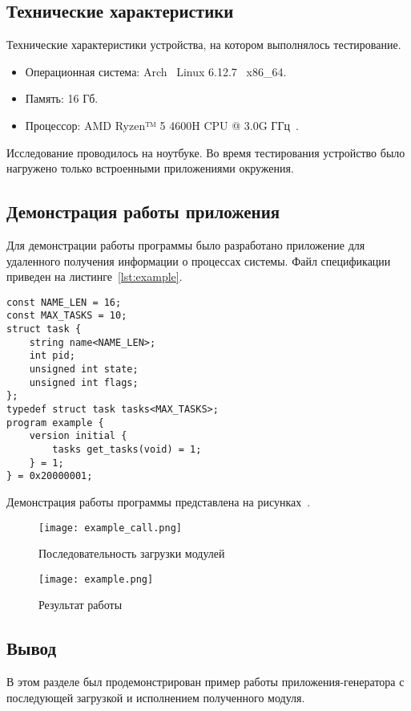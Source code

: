 
\vspace{-1\baselineskip}

\subsection{Технические характеристики}

Технические характеристики устройства, на котором выполнялось тестирование.

\begin{itemize}
    \item Операционная система: Arch~\cite{Arch} Linux 6.12.7~\cite{Linux} x86\_64.
    \item Память: 16 Гб.
    \item Процессор: AMD Ryzen™ 5 4600H CPU @ 3.0G ГГц~\cite{AMD_CPU}.
\end{itemize}

Исследование проводилось на ноутбуке. Во время тестирования
устройство было нагружено только встроенными приложениями окружения.

\subsection{Демонстрация работы приложения}

Для демонстрации работы программы было разработано приложение для удаленного
получения информации о процессах системы. Файл спецификации приведен на
листинге~\ref{lst:example}.

\begin{lstlisting}[caption={Файл спецификации примера}, label={lst:example}]
const NAME_LEN = 16;
const MAX_TASKS = 10;
struct task {
    string name<NAME_LEN>;
    int pid;
    unsigned int state;
    unsigned int flags;
};
typedef struct task tasks<MAX_TASKS>;
program example {
    version initial {
        tasks get_tasks(void) = 1;
    } = 1;
} = 0x20000001;
\end{lstlisting}

\clearpage

Демонстрация работы программы представлена на
рисунках~.

\begin{figure}[!h]
    \centering
    \texttt{[image: example\_call.png]}
    \caption{Последовательность загрузки модулей}
    \label{fig:example_call}
\end{figure}

\begin{figure}[!h]
    \centering
    \texttt{[image: example.png]}
    \caption{Результат работы}
    \label{fig:example}
\end{figure}

\subsection*{Вывод}

В этом разделе был продемонстрирован пример работы приложения-генератора с
последующей загрузкой и исполнением полученного модуля.

